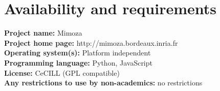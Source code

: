 \documentclass{bmcart}
\begin{document}



\section*{Availability and requirements}
\textbf{Project name:} Mimoza\\
\textbf{Project home page:} http://mimoza.bordeaux.inria.fr\\
\textbf{Operating system(s):} Platform independent\\
\textbf{Programming language:} Python, JavaScript\\
\textbf{License:} CeCILL (GPL compatible)\\
\textbf{Any restrictions to use by non-academics:} no restrictions

\end{document}
